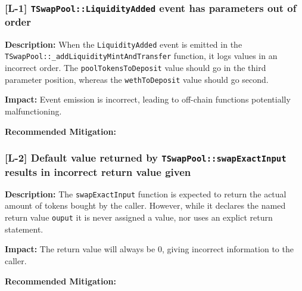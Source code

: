 \subsubsection{\texorpdfstring{{[}L-1{]}
\texttt{TSwapPool::LiquidityAdded} event has parameters out of
order}{{[}L-1{]} TSwapPool::LiquidityAdded event has parameters out of order}}\label{l-1-tswappoolliquidityadded-event-has-parameters-out-of-order}

\textbf{Description:} When the \texttt{LiquidityAdded} event is emitted
in the \texttt{TSwapPool::\_addLiquidityMintAndTransfer} function, it
logs values in an incorrect order. The \texttt{poolTokensToDeposit}
value should go in the third parameter position, whereas the
\texttt{wethToDeposit} value should go second.

\textbf{Impact:} Event emission is incorrect, leading to off-chain
functions potentially malfunctioning.

\textbf{Recommended Mitigation:}

\begin{Shaded}
\begin{Highlighting}[]
\end{Highlighting}
\end{Shaded}

\subsubsection{\texorpdfstring{{[}L-2{]} Default value returned by
\texttt{TSwapPool::swapExactInput} results in incorrect return value
given}{{[}L-2{]} Default value returned by TSwapPool::swapExactInput results in incorrect return value given}}\label{l-2-default-value-returned-by-tswappoolswapexactinput-results-in-incorrect-return-value-given}

\textbf{Description:} The \texttt{swapExactInput} function is expected
to return the actual amount of tokens bought by the caller. However,
while it declares the named return value \texttt{ouput} it is never
assigned a value, nor uses an explict return statement.

\textbf{Impact:} The return value will always be 0, giving incorrect
information to the caller.

\textbf{Recommended Mitigation:}

